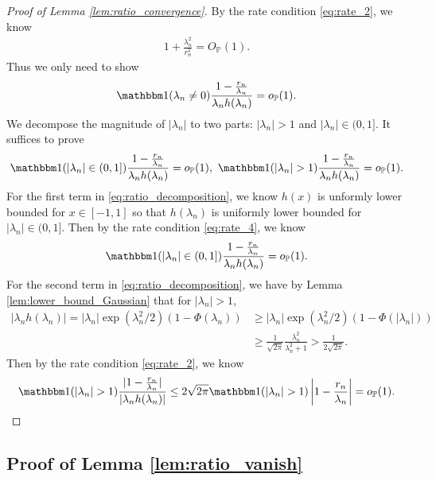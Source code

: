 \documentclass[12pt]{article}
\theoremstyle{definition}
\def\P{\mathbb{P}}
\def\P{\mathbb{P}}
\renewcommand{\P}{\mathbb{P}}							%
\newcommand{\indicator}{\mathbbm 1}						%
\begin{document}
\begin{proof}[Proof of Lemma \ref{lem:ratio_convergence}]
	By the rate condition \eqref{eq:rate_2}, we know 
	\begin{align*}
		1+\frac{\lambda_n^2}{r_n^2}=O_{\P}(1).
	\end{align*}
	Thus we only need to show 
	\begin{align*}
		\indicator(\lambda_n\neq 0)\frac{1-\frac{r_n}{\lambda_n}}{\lambda_nh(\lambda_n)}=o_{\P}(1).
	\end{align*}
	We decompose the magnitude of $|\lambda_n|$ to two parts: $|\lambda_n|> 1$ and $|\lambda_n|\in (0,1]$. It suffices to prove 
	\begin{align}\label{eq:ratio_decomposition}
		\indicator(|\lambda_n|\in (0,1])\frac{1-\frac{r_n}{\lambda_n}}{\lambda_nh(\lambda_n)}=o_{\P}(1),\ \indicator(|\lambda_n|>1)\frac{1-\frac{r_n}{\lambda_n}}{\lambda_nh(\lambda_n)}=o_{\P}(1).
	\end{align}
	For the first term in \eqref{eq:ratio_decomposition}, we know $h(x)$ is unformly lower bounded for $x\in[-1,1]$ so that $h(\lambda_n)$ is uniformly lower bounded for $|\lambda_n|\in (0,1]$. Then by the rate condition \eqref{eq:rate_4}, we know 
	\begin{align*}
		\indicator(|\lambda_n|\in (0,1])\frac{1-\frac{r_n}{\lambda_n}}{\lambda_nh(\lambda_n)}=o_{\P}(1).
	\end{align*}
	For the second term in \eqref{eq:ratio_decomposition}, we have by Lemma \ref{lem:lower_bound_Gaussian} that for $|\lambda_n|> 1$,
	\begin{align*}
		|\lambda_nh(\lambda_n)|=|\lambda_n|\exp(\lambda_n^2/2)(1-\Phi(\lambda_n))
		&
		\geq |\lambda_n|\exp(\lambda_n^2/2)(1-\Phi(|\lambda_n|))\\
		&
		\geq \frac{1}{\sqrt{2\pi}}\frac{\lambda_n^2}{\lambda_n^2+1}> \frac{1}{2\sqrt{2\pi}}.
	\end{align*}
	Then by the rate condition \eqref{eq:rate_2}, we know 
	\begin{align*}
		\indicator(|\lambda_n|>1)\frac{|1-\frac{r_n}{\lambda_n}|}{|\lambda_nh(\lambda_n)|}\leq 2\sqrt{2\pi}\indicator(|\lambda_n|>1)\left|1-\frac{r_n}{\lambda_n}\right|=o_{\P}(1).
	\end{align*}
\end{proof}

\subsection{Proof of Lemma \ref{lem:ratio_vanish}}
\end{document}
